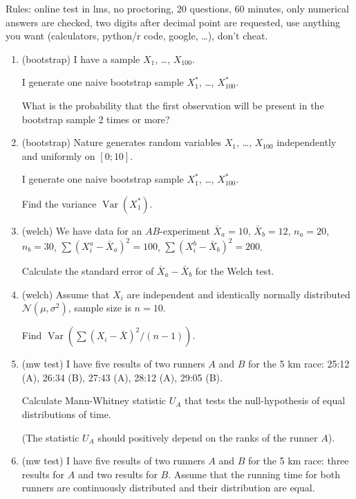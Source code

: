 \documentclass[12pt]{article}
\DeclareMathOperator{\Var}{Var}
\newcommand{\cN}{\mathcal{N}}
\begin{document}
Rules: online test in lms, no proctoring, 20 questions, 60 minutes, only numerical answers are checked, 
two digits after decimal point are requested, 
use anything you want (calculators, python/r code, google, \ldots), don't cheat. 


\begin{enumerate}
    \item (bootstrap) I have a sample $X_1$, \ldots, $X_{100}$.
    
    I generate one naive bootstrap sample $X_1^*$, \ldots, $X_{100}^*$. 

    What is the probability that the first observation will be present in the bootstrap sample 2 times or more?

    \item (bootstrap) Nature generates random variables $X_1$, \ldots, $X_{100}$ independently and uniformly on $[0;10]$.
    
    I generate one naive bootstrap sample $X_1^*$, \ldots, $X_{100}^*$. 

    Find the variance $\Var(X_1^*)$.
    \item (welch) We have data for an $AB$-experiment $\bar X_a = 10$, $\bar X_b = 12$, 
    $n_a = 20$, $n_b = 30$, $\sum (X_i^a - \bar X_a)^2 = 100$, $\sum (X_i^b - \bar X_b)^2 = 200$.

    Calculate the standard error of $\bar X_a - \bar X_b$ for the Welch test. 

    \item (welch) Assume that $X_i$ are independent and identically normally distributed $\cN(\mu, \sigma^2)$, 
    sample size is $n=10$. 
    
    Find $\Var(\sum (X_i - \bar X)^2 / (n - 1))$.
    
    \item (mw test) I have five results of two runners $A$ and $B$ for the 5 km race: 25:12 (A), 26:34 (B), 27:43 (A), 28:12 (A), 29:05 (B).
    
    Calculate Mann-Whitney statistic $U_A$ that tests the null-hypothesis of equal distributions of time. 
    
    (The statistic $U_A$ should positively depend on the ranks of the runner $A$). 
    \item (mw test) I have five results of two runners $A$ and $B$ for the 5 km race: three results for $A$ and two results for $B$.
    Assume that the running time for both runners are continuously distributed and their distribution are equal. 


\end{enumerate}
\end{document}
